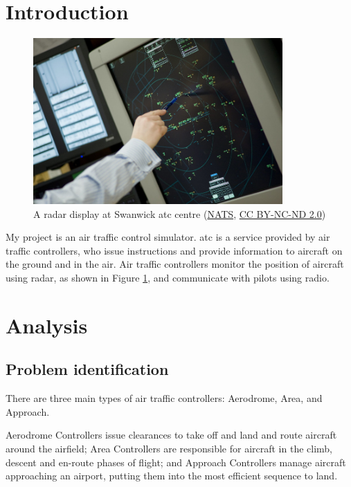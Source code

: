 \documentclass{article}
\begin{document}
\section{Introduction}
\begin{figure}[H]
\centering
\includegraphics[width=0.85\textwidth]{pictures/nats_radar.jpg}
\caption{\label{fig:radar}A radar display at Swanwick \acrshort{atc} centre (\href{https://www.nats.aero/}{NATS}, \href{https://creativecommons.org/licenses/by-nc-nd/2.0/}{CC BY-NC-ND 2.0})}
\end{figure}

My project is an air traffic control simulator.
\acrfull{atc} is a service provided by air traffic controllers, who issue instructions and provide information to aircraft on the ground and in the air.
Air traffic controllers monitor the position of aircraft using radar, as shown in Figure \ref{fig:radar}, and communicate with pilots using radio\cite{caadef}.


\section{Analysis}
\subsection{Problem identification}
There are three main types of air traffic controllers: Aerodrome, Area, and Approach.

Aerodrome Controllers issue clearances to take off and land and route aircraft around the airfield; Area Controllers are responsible for aircraft in the climb, descent and en-route phases of flight; and Approach Controllers manage aircraft approaching an airport, putting them into the most efficient sequence to land\cite{natscareers}.
\end{document}
